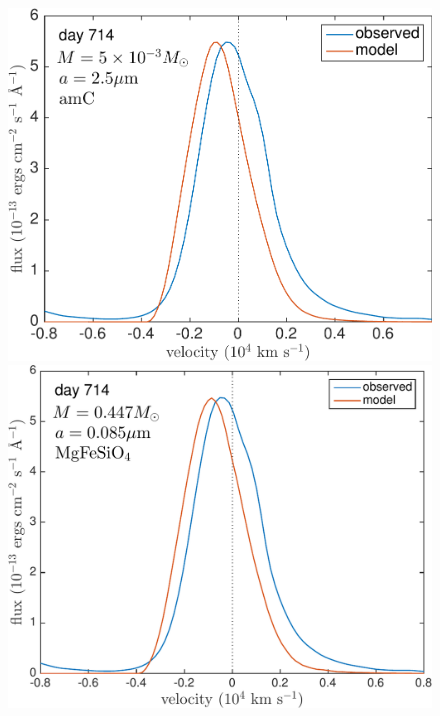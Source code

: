 \begin{landscape}
\begin{figure}
\includegraphics[trim =24 20 0 0,clip=true,scale=0.33]{chapters/chapter5/images/silicates_take2/AmC_Dwek_Ha.pdf}
\includegraphics[trim =24 20 0 0,clip=true,scale=0.33]{chapters/chapter5/images/silicates_take2/MgFeSiO4_Dwek_Ha.pdf}


\end{figure}
\end{landscape}
